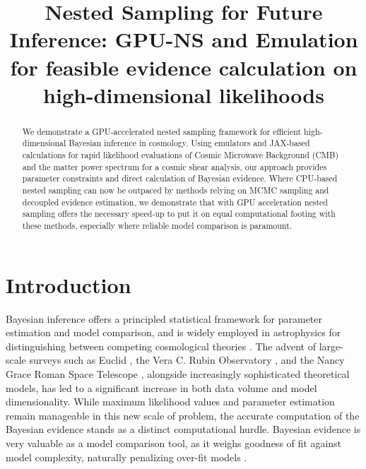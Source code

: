 \documentclass[twocolumn]{openjournal}
\begin{document}
\title{Nested Sampling for Future Inference: GPU-NS and Emulation for feasible evidence calculation on high-dimensional likelihoods}

\author{}


\begin{abstract}
We demonstrate a GPU-accelerated nested sampling framework for efficient high-dimensional Bayesian inference in cosmology. Using emulators and JAX-based calculations for rapid likelihood evaluations of Cosmic Microwave Background (CMB) and the matter power spectrum for a cosmic shear analysis, our approach provides parameter constraints and direct calculation of Bayesian evidence. Where CPU-based nested sampling can now be outpaced by methods relying on MCMC sampling and decoupled evidence estimation, we demonstrate that with GPU acceleration nested sampling offers the necessary speed-up to put it on equal computational footing with these methods, especially where reliable model comparison is paramount.
\end{abstract}

\section{Introduction}  
\label{sec:introduction}
Bayesian inference offers a principled statistical framework for parameter estimation and model comparison, and is widely employed in astrophysics for distinguishing between competing cosmological theories \citep{Trotta_2008}. The advent of large-scale surveys such as Euclid \citep{euclid}, the Vera C. Rubin Observatory \citep{Vera}, and the Nancy Grace Roman Space Telescope \citep{nancy}, alongside increasingly sophisticated theoretical models, has led to a significant increase in both data volume and model dimensionality. While maximum likelihood values and parameter estimation remain manageable in this new scale of problem, the accurate computation of the Bayesian evidence stands as a distinct computational hurdle. Bayesian evidence is very valuable as a model comparison tool, as it weighs goodness of fit against model complexity, naturally penalizing over-fit models \citep{Lovick:2023tnv}.
\end{document}
